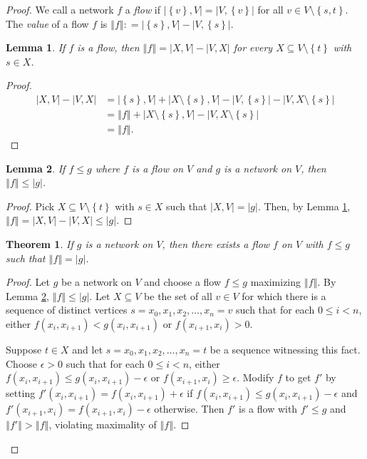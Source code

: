 \documentclass{amsbook}
\theoremstyle{plain}
\newtheorem{lemma}{Lemma}
\newtheorem{theorem}{Theorem}
\numberwithin{equation}{chapter}
\newcommand{\set}[1]{\left\{ #1 \right\}}
\newcommand{\card}[1]{\left|#1\right|}
\newcommand{\size}[1]{\left\Vert#1\right\Vert}
\newcommand{\DefinedAs}{\mathrel{\mathop:}=}
\begin{document}
\begin{proof}
We call a network $f$ a \emph{flow} if $\card{\set{v},V} = \card{V,\set{v}}$ for all $v \in V \setminus \set{s,t}$.
The \emph{value} of a flow $f$ is $\size{f} \DefinedAs \card{\set{s},V} - \card{V,\set{s}}$.

\begin{lemma}\label{FlowValues}
If $f$ is a flow, then $\size{f} = \card{X, V} - \card{V, X}$ for every $X \subseteq V\setminus\set{t}$ with $s \in X$.
\end{lemma}
\begin{proof}
\begin{align*}
\card{X, V} - \card{V, X} &= \card{\set{s}, V} + \card{X\setminus\set{s}, V} - \card{V, \set{s}} - \card{V, X\setminus\set{s}}\\
&= \size{f} + \card{X\setminus\set{s}, V} - \card{V, X\setminus\set{s}}\\
&= \size{f}.
\end{align*}
\end{proof}

\begin{lemma}\label{FlowAtMostCapacity}
If $f \le g$ where $f$ is a flow on $V$ and $g$ is a network on $V$, then $\size{f} \le \card{g}$.
\end{lemma}
\begin{proof}
Pick $X \subseteq V\setminus\set{t}$ with $s \in X$ such that $\card{X, V} = \card{g}$.  Then, by Lemma \ref{FlowValues}, $\size{f} = \card{X, V} - \card{V, X} \le \card{g}$.
\end{proof}

\begin{theorem}
If $g$ is a network on $V$, then there exists a flow $f$ on $V$ with $f \le g$ such that $\size{f} = \card{g}$.
\end{theorem}
\begin{proof}
Let $g$ be a network on $V$ and choose a flow $f \le g$ maximizing $\size{f}$.  By Lemma \ref{FlowAtMostCapacity}, $\size{f} \le \card{g}$.
Let $X \subseteq V$ be the set of all $v \in V$ for which there is a sequence of distinct vertices $s = x_0, x_1, x_2, \ldots, x_n = v$ such that for each $0 \le i < n$, either
$f(x_i, x_{i+1}) < g(x_i, x_{i+1})$ or $f(x_{i+1}, x_i) > 0$.  

Suppose $t \in X$ and let $s = x_0, x_1, x_2, \ldots, x_n = t$ be a sequence witnessing this fact.  
Choose $\epsilon > 0$ such that for each $0 \le i < n$, either $f(x_i, x_{i+1}) \le g(x_i, x_{i+1}) - \epsilon$ or $f(x_{i+1}, x_i) \ge \epsilon$.  Modify $f$ to get $f'$
by setting $f'(x_i, x_{i+1}) = f(x_i, x_{i+1}) + \epsilon$ if $f(x_i, x_{i+1}) \le g(x_i, x_{i+1}) - \epsilon$ and $f'(x_{i+1}, x_i) = f(x_{i+1}, x_i) -\epsilon$ otherwise.
Then $f'$ is a flow with $f' \le g$ and $\size{f'} > \size{f}$, violating maximality of $\size{f}$.


\end{proof}
\end{proof}
\end{document}
